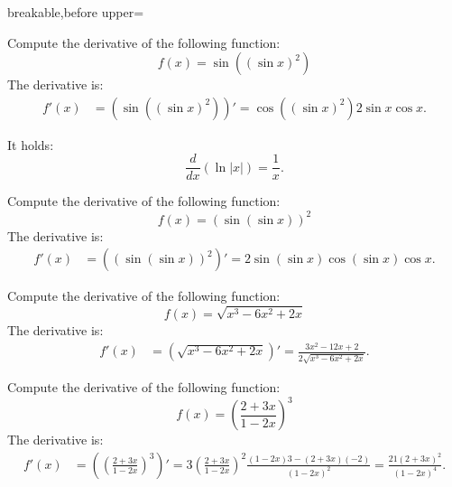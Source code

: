 \begin{dispListing*}{breakable,before upper=}
\tcbstartrecording\relax

\begin{exercise}
  Compute the derivative of the following function:
  \begin{equation*}
    f(x)=\sin((\sin x)^2)
  \end{equation*}
\tcblower
  The derivative is:
  \begin{align*}
    f'(x) &= \left( \sin((\sin x)^2) \right)'
    =\cos((\sin x)^2) 2\sin x \cos x.
  \end{align*}
\end{exercise}

\begin{exercise}[no solution]
  It holds:
  \begin{equation*}
    \frac{d}{dx}\left(\ln|x|\right) = \frac{1}{x}.
  \end{equation*}
\end{exercise}

\begin{exercise}
  Compute the derivative of the following function:
  \begin{equation*}
    f(x)=(\sin(\sin x))^2
  \end{equation*}
\tcblower
  The derivative is:
  \begin{align*}
    f'(x) &= \left( (\sin(\sin x))^2 \right)'
    =2\sin(\sin x)\cos(\sin x)\cos x.
  \end{align*}
\end{exercise}

\begin{exercise}
  Compute the derivative of the following function:
  \begin{equation*}
    f(x)=\sqrt{x^3-6x^2+2x}
  \end{equation*}
\tcblower
  The derivative is:
  \begin{align*}
    f'(x) &= \left( \sqrt{x^3-6x^2+2x} \right)'
    = \frac{3x^2-12x+2}{2\sqrt{x^3-6x^2+2x}}.
  \end{align*}
\end{exercise}

\begin{exercise}
  Compute the derivative of the following function:
  \begin{equation*}
    f(x)=\left(\frac{2+3x}{1-2x}\right)^3
  \end{equation*}
\tcblower
  The derivative is:
  \begin{align*}
    f'(x) &= \left( \left(\frac{2+3x}{1-2x}\right)^3 \right)'
    = 3 \left(\frac{2+3x}{1-2x}\right)^2 \frac{(1-2x)3-(2+3x)(-2)}{(1-2x)^2}
    = \frac{21(2+3x)^2}{(1-2x)^4}.
  \end{align*}
\end{exercise}


\end{dispListing*}
